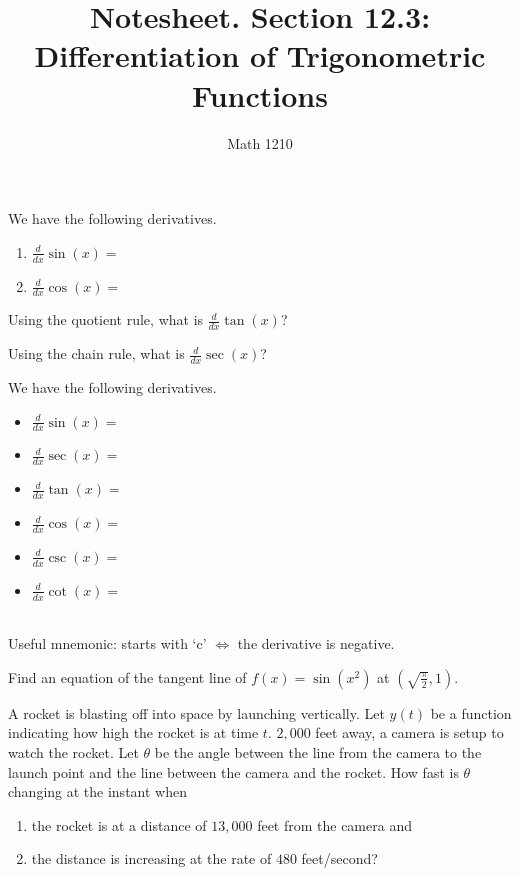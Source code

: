 \documentclass[12pt, a4paper]{article}
\author{Math 1210}
\title{Notesheet. Section 12.3: Differentiation of Trigonometric Functions}
\date{}
\begin{document}
\maketitle
\nameline
\begin{thrm}
  We have the following derivatives.
  \begin{enumerate}
  \item \(\frac{d}{dx} \sin(x) = \)
  \item \(\frac{d}{dx} \cos(x) = \)
  \end{enumerate}
\end{thrm}
\begin{ex}
  Using the quotient rule, what is \(\frac{d}{dx} \tan(x)\)?
\end{ex}
\begin{ex}
  Using the chain rule, what is \(\frac{d}{dx} \sec(x)\)? 
\end{ex}
\begin{thrm}
  We have the following derivatives.\\
  \begin{minipage}{0.5\linewidth}
    \begin{itemize}
    \item \(\frac{d}{dx} \sin(x) = \)
    \item \(\frac{d}{dx} \sec(x) = \)
    \item \(\frac{d}{dx} \tan(x) = \)
    \end{itemize}
  \end{minipage}
  \begin{minipage}{0.4\linewidth}
    \begin{itemize}
    \item \(\frac{d}{dx} \cos(x) = \)
    \item \(\frac{d}{dx} \csc(x) = \)
    \item \(\frac{d}{dx} \cot(x) = \)
    \end{itemize}
  \end{minipage}
  \ \\
  
  Useful mnemonic: starts with `c' \(\iff\) the derivative is negative.
\end{thrm}
\begin{ex}
  Find an equation of the tangent line of \(f(x) = \sin(x^2)\) at
  \(\left( \sqrt{\frac{\pi}{2}}, 1 \right)\). 
\end{ex}
\begin{ex}
  A rocket is blasting off into space by launching
  vertically. Let \(y(t)\) be a function indicating how high the
  rocket is at time \(t\). \(2,000\) feet away, a camera is setup to
  watch the 
  rocket. Let \(\theta\) be the angle between the line from the camera
  to the launch point and the line between the camera and the rocket.
  How fast is \(\theta\) changing at the instant when  
  \begin{enumerate}
  \item the rocket is at a distance of \(13,000\) feet from the camera
    and
  \item the distance is increasing at the rate of \(480\) feet/second?
  \end{enumerate}

\end{ex}
\end{document}
